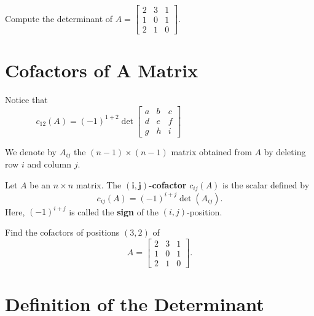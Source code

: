 \documentclass[20pt,a4paper]{extarticle}
\newcounter{example}
\newcounter{definition}
\begin{document}
\begin{example}
Compute the determinant of $A = \begin{bmatrix} 2 & 3 & 1 \\ 1 & 0 & 1 \\ 2 & 1 & 0 \end{bmatrix}$.
\end{example}

\begin{solution}

\end{solution}

\newpage 

\section{Cofactors of A Matrix} 
Notice that
	\[
		c_{12} (A) = (-1)^{1 + 2} \det \begin{bmatrix} a & b & c \\ d & e & f \\ g & h & i \end{bmatrix}  \phantom{= (-1)^{1 + 2} \det \begin{bmatrix} d & f \\ \\ g & i \end{bmatrix}}
	\]

We denote by $A_{ij}$ the $(n - 1) \times (n - 1)$ matrix obtained from $A$ by deleting row $i$ and column $j$.

\begin{definition}
Let $A$ be an $n \times n$ matrix. The $\mathbf{(i, j)}$\textbf{-cofactor} $c_{ij} (A)$ is the scalar defined by
	\[
	 	c_{ij} (A) = (-1)^{i + j} \det (A_{ij}) .
	\] 
Here, $(-1)^{i + j}$ is called the \textbf{sign} of the $(i, j)$-position.
\end{definition}

\begin{example}
Find the cofactors of positions $(3,2)$ of $$A = \begin{bmatrix} 2 & 3 & 1 \\ 1 & 0 & 1 \\ 2 & 1 & 0 \end{bmatrix}.$$
\end{example}

\newpage 

\section{Definition of the Determinant}
\end{document}
